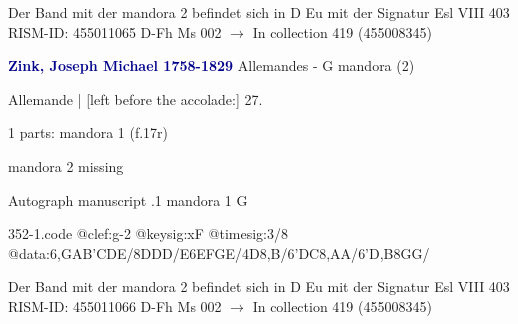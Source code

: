 \documentclass[twocolumn]{book}
\begin{document}
\newline Der Band mit der mandora 2 befindet sich in D Eu mit der Signatur Esl VIII 403
\newline RISM-ID: 455011065
\newline D-Fh  Ms 002
\newline $\rightarrow$ In collection 419 (455008345)
      
\newline \par \vspace{7pt} \textcolor{darkblue}{\textbf{Zink, Joseph Michael  1758-1829}}
\newline Allemandes - G
\newline mandora (2)
\newline \begin{itshape}[f.17r, at left:] Allemande | [left before the accolade:] 27.\end{itshape} 
\newline \textcolor{darkblue}{}  1 parts: mandora 1  (f.17r)
\newline \begin{small} mandora 2 missing\end{small} 
\newline Autograph manuscript
.1  mandora 1  G  
\begin{filecontents*}{352-1.code}
@clef:g-2
@keysig:xF
@timesig:3/8
@data:{6,GA}{B'C}DE/8DDD/E{6EF}{GE}/4D8,B/{6'DC}8,AA/{6'D,B}8GG/
\end{filecontents*}
\newline
%

\newline Der Band mit der mandora 2 befindet sich in D Eu mit der Signatur Esl VIII 403
\newline RISM-ID: 455011066
\newline D-Fh  Ms 002
\newline $\rightarrow$ In collection 419 (455008345)
      
\end{document}
